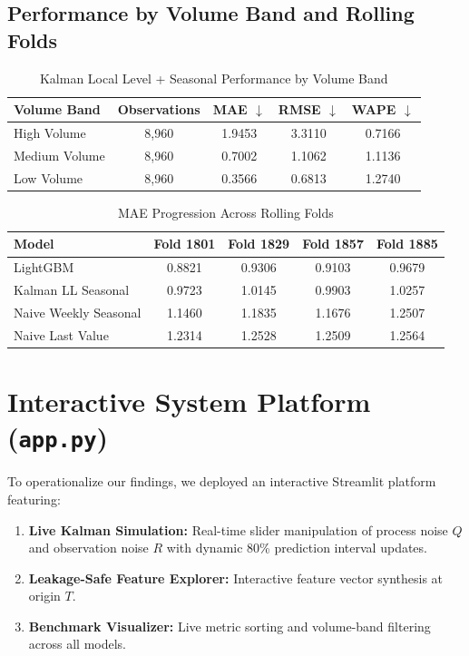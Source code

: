 \documentclass[11pt,a4paper]{article}
\begin{document}
\subsection{Performance by Volume Band and Rolling Folds}

\begin{table}[htbp]
\centering
\caption{Kalman Local Level + Seasonal Performance by Volume Band}
\label{tab:vol_band}
\begin{tabular}{lcccc}
\toprule
\textbf{Volume Band} & \textbf{Observations} & \textbf{MAE $\downarrow$} & \textbf{RMSE $\downarrow$} & \textbf{WAPE $\downarrow$} \\
\midrule
High Volume & 8,960 & 1.9453 & 3.3110 & 0.7166 \\
Medium Volume & 8,960 & 0.7002 & 1.1062 & 1.1136 \\
Low Volume & 8,960 & 0.3566 & 0.6813 & 1.2740 \\
\bottomrule
\end{tabular}
\end{table}

\begin{table}[htbp]
\centering
\caption{MAE Progression Across Rolling Folds}
\label{tab:fold_progression}
\begin{tabular}{lcccc}
\toprule
\textbf{Model} & \textbf{Fold 1801} & \textbf{Fold 1829} & \textbf{Fold 1857} & \textbf{Fold 1885} \\
\midrule
LightGBM & 0.8821 & 0.9306 & 0.9103 & 0.9679 \\
Kalman LL Seasonal & 0.9723 & 1.0145 & 0.9903 & 1.0257 \\
Naive Weekly Seasonal & 1.1460 & 1.1835 & 1.1676 & 1.2507 \\
Naive Last Value & 1.2314 & 1.2528 & 1.2509 & 1.2564 \\
\bottomrule
\end{tabular}
\end{table}

\section{Interactive System Platform (\texttt{app.py})}
To operationalize our findings, we deployed an interactive Streamlit platform featuring:
\begin{enumerate}
    \item \textbf{Live Kalman Simulation:} Real-time slider manipulation of process noise $Q$ and observation noise $R$ with dynamic 80\% prediction interval updates.
    \item \textbf{Leakage-Safe Feature Explorer:} Interactive feature vector synthesis at origin $T$.
    \item \textbf{Benchmark Visualizer:} Live metric sorting and volume-band filtering across all models.
\end{enumerate}
\end{document}
